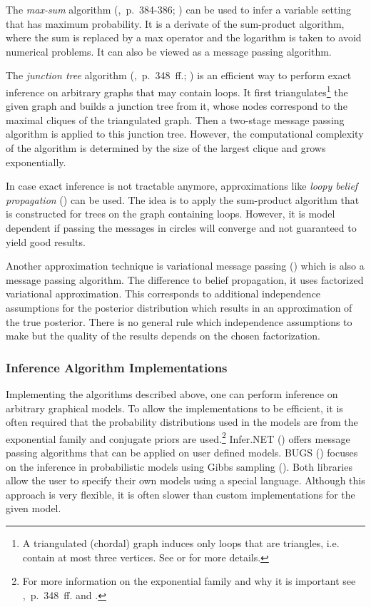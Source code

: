 The \emph{max-sum} algorithm (\cite{bishop2006pattern},~p.~384-386; \cite{dawid1992applications}) can be used to infer a variable setting that has maximum probability. It is a derivate of the sum-product algorithm, where the sum is replaced by a max operator and the logarithm is taken to avoid numerical problems. It can also be viewed as a message passing algorithm.

The \emph{junction tree} algorithm (\cite{koller2009probabilistic},~p.~348~ff.; \cite{lauritzen1988local}) is an efficient way to perform exact inference on arbitrary graphs that may contain loops. It first triangulates\footnote{A triangulated (chordal) graph induces only loops that are triangles, i.e. contain at most three vertices.  See \textcite{fulkerson1965incidence} or \textcite{rose1976algorithmic} for more details.} the given graph and builds a junction tree from it, whose nodes correspond to the maximal cliques of the triangulated graph. Then a two-stage message passing algorithm is applied to this junction tree. However, the computational complexity of the algorithm is determined by the size of the largest clique and grows exponentially.

In case exact inference is not tractable anymore, approximations like \emph{loopy belief propagation} (\cite{frey1998revolution}) can be used. The idea is to apply the sum-product algorithm that is constructed for trees on the graph containing loops. However, it is model dependent if passing the messages in circles will converge and not guaranteed to yield good results.

Another approximation technique is variational message passing (\cite{winn2005variational}) which is also a message passing algorithm. The difference to belief propagation, it uses factorized variational approximation. This corresponds to additional independence assumptions for the posterior distribution which results in an approximation of the true posterior. There is no general rule which independence assumptions to make but the quality of the results depends on the chosen factorization.

\subsubsection{Inference Algorithm Implementations}
\label{subsec:custom-inference}

Implementing the algorithms described above, one can perform inference on arbitrary graphical models. To allow the implementations to be efficient, it is often required that the probability distributions used in the models are from the exponential family and conjugate priors are used.\footnote{For more information on the exponential family and why it is important see \textcite{murphy2012machine},~p.~348~ff. and \textcite{andersen1970sufficiency}.} Infer.NET (\cite{InferNET12}) offers message passing algorithms that can be applied on user defined models. BUGS (\cite{lunn2009bugs}) focuses on the inference in probabilistic models using Gibbs sampling (\cite{geman1984stochastic}). Both libraries allow the user to specify their own models using a special language. Although this approach is very flexible, it is often slower than custom implementations for the given model.

